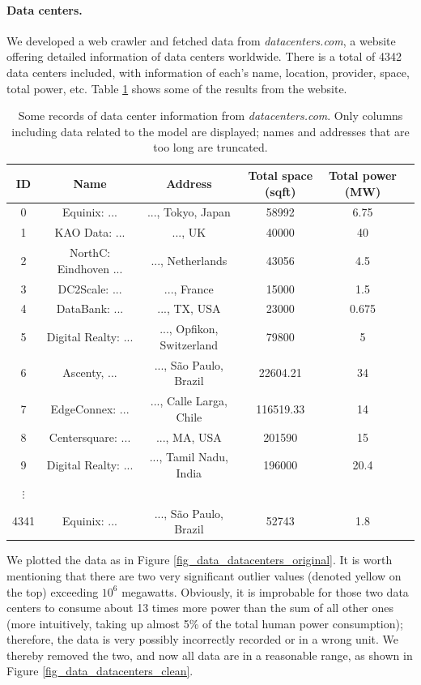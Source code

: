 \documentclass[12pt]{article}
\begin{document}
\paragraph{Data centers.} We developed a web crawler and fetched data from \textit{datacenters.com}, a website offering detailed information of data centers worldwide. There is a total of 4342 data centers included, with information of each's name, location, provider, space, total power, etc. Table \ref{table_data_datacenters.com} shows some of the results from the website.

\begin{table}[t]
	\centering
	\caption{Some records of data center information from \textit{datacenters.com}. Only columns including data related to the model are displayed; names and addresses that are too long are truncated.}
	\label{table_data_datacenters.com}
	\small
	\begin{tabular}{cccccc}
		\hline
		\textbf{ID} & \textbf{Name} & \textbf{Address} & \textbf{Total space} (sqft) & \textbf{Total power} (MW) \\
		\hline
		0 & Equinix: ... & ..., Tokyo, Japan & 58992 & 6.75 \\
		1 & KAO Data: ... & ..., UK & 40000 & 40 \\
		2 & NorthC: Eindhoven ... & ..., Netherlands & 43056 & 4.5 \\
		3 & DC2Scale: ... & ..., France & 15000 & 1.5 \\
		4 & DataBank: ... & ..., TX, USA & 23000 & 0.675 \\
		5 & Digital Realty: ... & ..., Opfikon, Switzerland & 79800 & 5 \\
		6 & Ascenty, ... & ..., São Paulo, Brazil & 22604.21 & 34 \\
		7 & EdgeConnex: ... & ..., Calle Larga, Chile & 116519.33 & 14 \\
		8 & Centersquare: ... & ..., MA, USA & 201590 & 15 \\
		9 & Digital Realty: ... & ..., Tamil Nadu, India & 196000 & 20.4 \\
		$\vdots$ &&&& \\
		4341 & Equinix: ... & ..., São Paulo, Brazil & 52743 & 1.8 \\
		\hline
	\end{tabular}
\end{table}

We plotted the data as in Figure \ref{fig_data_datacenters_original}. It is worth mentioning that there are two very significant outlier values (denoted yellow on the top) exceeding $10^6$ megawatts. Obviously, it is improbable for those two data centers to consume about 13 times more power than the sum of all other ones (more intuitively, taking up almost 5\% of the total human power consumption); therefore, the data is very possibly incorrectly recorded or in a wrong unit. We thereby removed the two, and now all data are in a reasonable range, as shown in Figure \ref{fig_data_datacenters_clean}.
\end{document}
